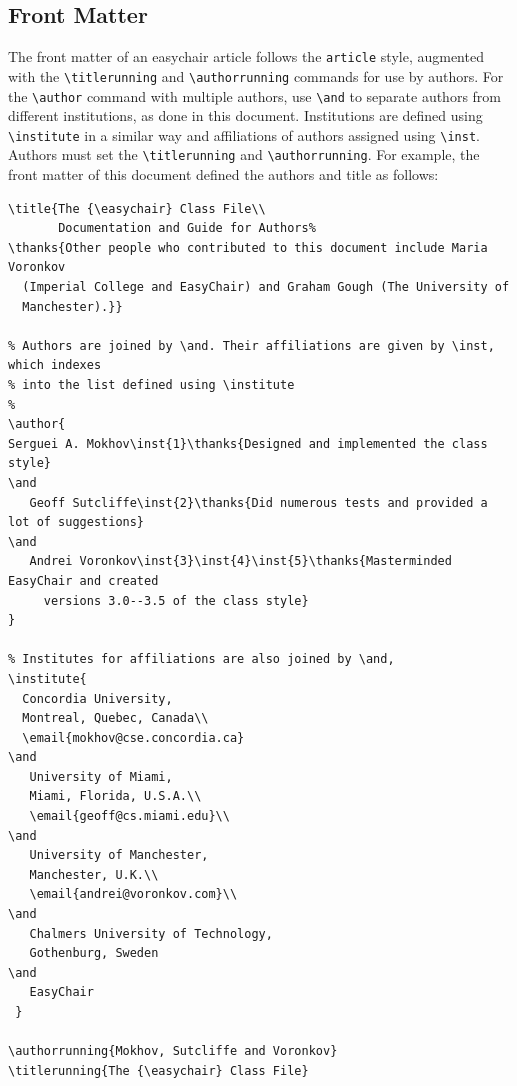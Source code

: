 \documentclass{easychair}
\newcommand{\easychair}{\textsf{easychair}}
\begin{document}
\subsection{Front Matter}
\label{sect:front-matter}

The front matter of an {\easychair} article follows the \texttt{article}
style, augmented with the \verb+\titlerunning+ and \verb+\authorrunning+
commands for use by authors. 
For the \verb+\author+ command with multiple authors, use \verb+\and+ to
separate authors from different institutions, as done in this document.
Institutions are defined using \verb+\institute+ in a similar way and affiliations of authors assigned using \verb+\inst+.
Authors must set the \verb+\titlerunning+ and \verb+\authorrunning+.
For example, the front matter of this document defined the authors
and title as follows:


\noindent\small
\begin{verbatim}
\title{The {\easychair} Class File\\
       Documentation and Guide for Authors%
\thanks{Other people who contributed to this document include Maria Voronkov
  (Imperial College and EasyChair) and Graham Gough (The University of
  Manchester).}}

% Authors are joined by \and. Their affiliations are given by \inst, which indexes
% into the list defined using \institute
%
\author{
Serguei A. Mokhov\inst{1}\thanks{Designed and implemented the class style}
\and
   Geoff Sutcliffe\inst{2}\thanks{Did numerous tests and provided a lot of suggestions}
\and
   Andrei Voronkov\inst{3}\inst{4}\inst{5}\thanks{Masterminded EasyChair and created 
     versions 3.0--3.5 of the class style}
}

% Institutes for affiliations are also joined by \and,
\institute{
  Concordia University,
  Montreal, Quebec, Canada\\
  \email{mokhov@cse.concordia.ca}
\and
   University of Miami,
   Miami, Florida, U.S.A.\\
   \email{geoff@cs.miami.edu}\\
\and
   University of Manchester,
   Manchester, U.K.\\
   \email{andrei@voronkov.com}\\
\and
   Chalmers University of Technology,
   Gothenburg, Sweden
\and
   EasyChair
 }

\authorrunning{Mokhov, Sutcliffe and Voronkov}
\titlerunning{The {\easychair} Class File}
\end{verbatim}
\normalsize
\end{document}
